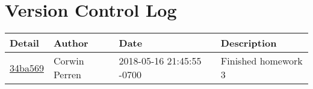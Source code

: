 \section{Version Control Log}
\begin{center}
\begin{tabular}{l l l l}	\textbf{Detail} & \textbf{Author} & \textbf{Date} &\textbf{Description}\\\hline

\href{.//commit/34ba569ad1c705e8d6054e20f0a129a21d2bc0c1}{34ba569} & Corwin Perren & 2018-05-16 21:45:55 -0700 &Finished homework 3\\\hline

\end{tabular}
\end{center}